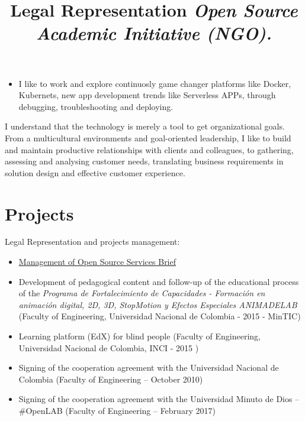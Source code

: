 \documentclass[overlapped,line,final]{res}
\begin{document}
\begin{resume}
\begin{itemize}
    \item I like to work and explore continuosly game changer platforms like Docker, Kubernets, new app development trends like Serverless APPs, through debugging, troubleshooting and deploying.
\end{itemize}
    
I understand that the technology is merely a tool to get organizational goals. From a multicultural environments and goal-oriented leadership, I like to build and maintain productive relationships with clients and colleagues, to gathering, assessing and analysing customer needs, translating business requirements in solution design and effective customer experience.

\vspace{0.5cm}
\section{\sc Projects } %
\vspace{0.5cm}
\title{\bf Legal Representation
	\newline \em Open Source Academic Initiative (NGO).
}
\begin{position}
Legal Representation and projects management:

\begin{itemize}
\item \href{https://opensai.org/business}{Management of Open Source Services Brief}
\item Development of pedagogical content and follow-up of the educational process of the \textit{Programa de Fortalecimiento de Capacidades - Formación en animación digital, 2D, 3D, StopMotion y Efectos Especiales ANIMADELAB} (Faculty of Engineering, Universidad Nacional de Colombia - 2015 - MinTIC)
\item Learning platform (EdX) for blind people (Faculty of Engineering, Universidad Nacional de Colombia, INCI - 2015 )
\item Signing of the cooperation agreement with the Universidad Nacional de Colombia (Faculty of Engineering – October 2010)
\item Signing of the cooperation agreement with the Universidad Minuto de Dios – \#OpenLAB (Faculty of Engineering – February 2017)
\end{itemize}


\end{position}
\end{resume}
\end{document}
